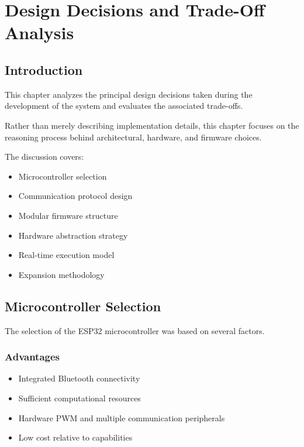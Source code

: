 \chapter{Design Decisions and Trade-Off Analysis}

\section{Introduction}

This chapter analyzes the principal design decisions taken during the development of the system and evaluates the associated trade-offs.

Rather than merely describing implementation details, this chapter focuses on the reasoning process behind architectural, hardware, and firmware choices.

The discussion covers:

\begin{itemize}
	\item Microcontroller selection
	\item Communication protocol design
	\item Modular firmware structure
	\item Hardware abstraction strategy
	\item Real-time execution model
	\item Expansion methodology
\end{itemize}


\section{Microcontroller Selection}

The selection of the ESP32 microcontroller was based on several factors.

\subsection{Advantages}

\begin{itemize}
	\item Integrated Bluetooth connectivity
	\item Sufficient computational resources
	\item Hardware PWM and multiple communication peripherals
	\item Low cost relative to capabilities
\end{itemize}

